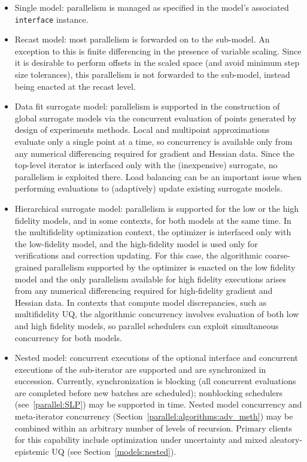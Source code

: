 \begin{itemize}
\item Single model: parallelism is managed as specified in the model's
  associated \texttt{interface} instance.

\item Recast model: most parallelism is forwarded on to the sub-model.
  An exception to this is finite differencing in the presence of
  variable scaling.  Since it is desirable to perform offsets in the
  scaled space (and avoid minimum step size tolerances), this
  parallelism is not forwarded to the sub-model, instead being enacted
  at the recast level.

\item Data fit surrogate model: parallelism is supported in the
  construction of global surrogate models via the concurrent
  evaluation of points generated by design of experiments methods.
  Local and multipoint approximations evaluate only a single point at
  a time, so concurrency is available only from any numerical
  differencing required for gradient and Hessian data.  Since the
  top-level iterator is interfaced only with the (inexpensive)
  surrogate, no parallelism is exploited there.  Load balancing can be
  an important issue when performing evaluations to (adaptively)
  update existing surrogate models.

\item Hierarchical surrogate model: parallelism is supported for the
  low or the high fidelity models, and in some contexts, for both
  models at the same time.  In the multifidelity optimization context,
  the optimizer is interfaced only with the low-fidelity model, and
  the high-fidelity model is used only for verifications and
  correction updating.  For this case, the algorithmic coarse-grained
  parallelism supported by the optimizer is enacted on the low
  fidelity model and the only parallelism available for high fidelity
  executions arises from any numerical differencing required for
  high-fidelity gradient and Hessian data.  In contexts that compute
  model discrepancies, such as multifidelity UQ, the algorithmic
  concurrency involves evaluation of both low and high fidelity
  models, so parallel schedulers can exploit simultaneous concurrency
  for both models.

\item Nested model: concurrent executions of the optional interface
  and concurrent executions of the sub-iterator are supported and are
  synchronized in succession.  Currently, synchronization is blocking
  (all concurrent evaluations are completed before new batches are
  scheduled); nonblocking schedulers (see~\ref{parallel:SLP}) may be
  supported in time.  Nested model concurrency and meta-iterator
  concurrency (Section~\ref{parallel:algorithms:adv_meth}) may be
  combined within an arbitrary number of levels of recursion.  Primary
  clients for this capability include optimization under uncertainty
  and mixed aleatory-epistemic UQ (see Section~\ref{models:nested}).
\end{itemize}


